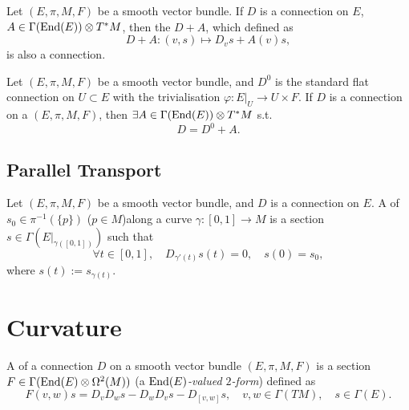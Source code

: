 \documentclass[openany, oneside, a5paper]{book}
\begin{document}
\begin{theorem}
    Let $(E, \pi, M, F)$ be a smooth vector bundle.
    If $D$ is a connection on $E$, $A \in \Gamma(\operatorname{End}(E)) \otimes T^*M$, then
    the $D + A$, which defined as
    \begin{equation}
        D + A \colon (v, s)  \mapsto D_v s + A(v) s,
    \end{equation}
    is also a connection.
\end{theorem}

\begin{theorem}
    Let $(E, \pi, M, F)$ be a smooth vector bundle, and $D^0$ is the standard flat connection on $U \subset E$ with the trivialisation $\varphi \colon E|_U \to U \times F$.
    If $D$ is a connection on a $(E, \pi, M, F)$,
    then $\exists A \in \Gamma(\operatorname{End}(E)) \otimes T^*M$ s.t.\ 
    \begin{equation}
        D = D^0 + A.
    \end{equation}
\end{theorem}

\section{Parallel Transport}

\begin{definition}
    Let $(E, \pi, M, F)$ be a smooth vector bundle, and $D$ is a connection on $E$.
    A \indexbf{paralell transport} of $s_0 \in \pi^{-1}(\{p\})$ ($p \in M$)along a curve $\gamma \colon [0, 1] \to M$ is a section $s \in \Gamma(E|_{\gamma([0, 1])})$ such that
    \begin{equation}
        \forall t \in [0, 1], 
        \quad 
        D_{\gamma'(t)} s(t) = 0,
        \quad
        s(0) = s_0,
    \end{equation}
    where $s(t) := s_{\gamma(t)}$.
\end{definition}

\chapter{Curvature}

\begin{definition}[Curvature]
    A  of a connection $D$ on a smooth vector bundle $(E, \pi, M, F)$ is a section $F \in \Gamma(\operatorname{End}(E) \otimes \Omega^2(M))$ (a \emph{$\operatorname{End}(E)$-valued $2$-form}) defined as
    \begin{equation}
        F(v, w) s = D_v D_w s - D_w D_v s - D_{[v, w]} s,
        \quad
        v, w \in \Gamma(TM),
        \quad
        s \in \Gamma(E).
    \end{equation} 
\end{definition}
\end{document}
